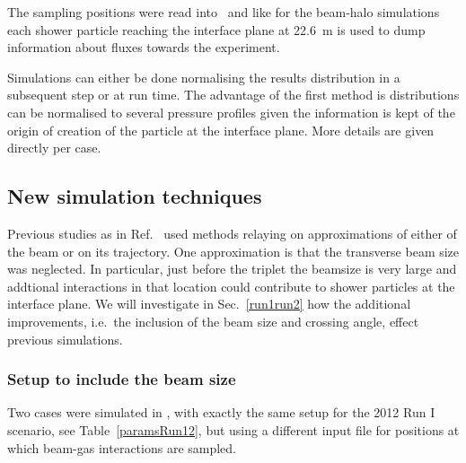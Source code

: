 The sampling positions were read into \fluka~and like for the beam-halo simulations each shower particle reaching the interface plane at 22.6~m is used to dump information about fluxes towards the experiment. 

Simulations can either be done normalising the results distribution in a subsequent step or at run time. The advantage of the first method is distributions can be normalised to several pressure profiles given the information is kept of the origin of creation of the particle at the interface plane. More details are given directly per case.%

\subsection{New simulation techniques}
Previous studies as in Ref.~\cite{nimPaperRod} used methods relaying on approximations of either of the beam or on its trajectory. One approximation is that the transverse beam size was neglected. In particular, just before the triplet the beamsize is very large and addtional interactions in that location could contribute to shower particles at the interface plane. We will investigate in Sec.~\ref{run1run2} how the additional improvements, i.e.~the inclusion of the beam size and crossing angle, effect previous simulations. 

\subsubsection{Setup to include the beam size}
Two cases were simulated in \fluka, with exactly the same setup for the 2012 Run I scenario, see Table~\ref{paramsRun12}, but using a different input file for positions at which beam-gas interactions are sampled.


